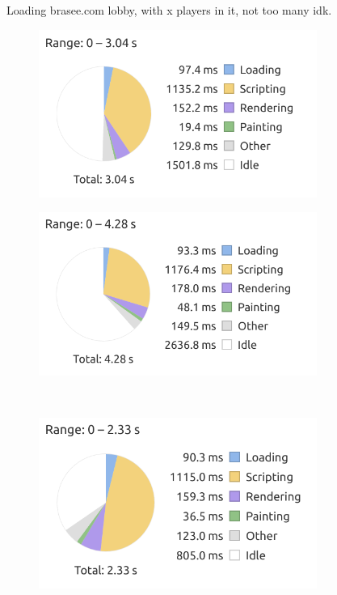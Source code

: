 \begin{figure}[h!]
    \caption{Loading brasee.com lobby, with x players in it, not too many idk.}
    \label{fig:my_label}
\end{figure}

\begin{figure}[h!]
    \centering
    \begin{subfigure}{0.49\textwidth}
        \includegraphics[width=\textwidth]{figure/clientsidePerformance/ligraph1.png}
    \end{subfigure}
    \begin{subfigure}{0.49\textwidth}
        \includegraphics[width=\textwidth]{figure/clientsidePerformance/ligraph2.png}
    \end{subfigure}
    \\
    \begin{subfigure}{0.5\textwidth}
        \includegraphics[width=\textwidth]{figure/clientsidePerformance/ligraph3.png}
    \end{subfigure}
    

\end{figure}
